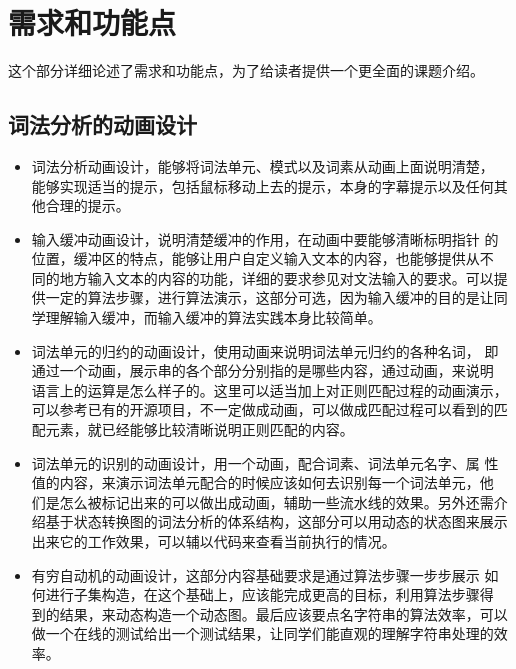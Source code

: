 \section{需求和功能点}
这个部分详细论述了需求和功能点，为了给读者提供一个更全面的课题介绍。
\subsection{词法分析的动画设计}
\begin{itemize}
\item 词法分析动画设计，能够将词法单元、模式以及词素从动画上面说明清楚，
  能够实现适当的提示，包括鼠标移动上去的提示，本身的字幕提示以及任何其
  他合理的提示。
\item 输入缓冲动画设计，说明清楚缓冲的作用，在动画中要能够清晰标明指针
  的位置，缓冲区的特点，能够让用户自定义输入文本的内容，也能够提供从不
  同的地方输入文本的内容的功能，详细的要求参见对文法输入的要求。可以提
  供一定的算法步骤，进行算法演示，这部分可选，因为输入缓冲的目的是让同
  学理解输入缓冲，而输入缓冲的算法实践本身比较简单。
\item 词法单元的归约的动画设计，使用动画来说明词法单元归约的各种名词，
  即通过一个动画，展示串的各个部分分别指的是哪些内容，通过动画，来说明
  语言上的运算是怎么样子的。这里可以适当加上对正则匹配过程的动画演示，
  可以参考已有的开源项目，不一定做成动画，可以做成匹配过程可以看到的匹
  配元素，就已经能够比较清晰说明正则匹配的内容。
\item 词法单元的识别的动画设计，用一个动画，配合词素、词法单元名字、属
  性值的内容，来演示词法单元配合的时候应该如何去识别每一个词法单元，他
  们是怎么被标记出来的可以做出成动画，辅助一些流水线的效果。另外还需介
  绍基于状态转换图的词法分析的体系结构，这部分可以用动态的状态图来展示
  出来它的工作效果，可以辅以代码来查看当前执行的情况。
\item 有穷自动机的动画设计，这部分内容基础要求是通过算法步骤一步步展示
  如何进行子集构造，在这个基础上，应该能完成更高的目标，利用算法步骤得
  到的结果，来动态构造一个动态图。最后应该要点名字符串的算法效率，可以
  做一个在线的测试给出一个测试结果，让同学们能直观的理解字符串处理的效
  率。
\end{itemize}
